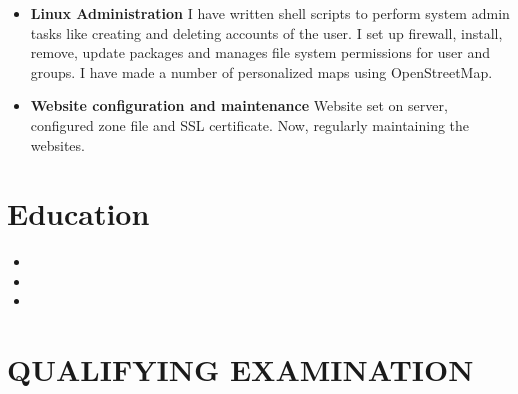 \documentclass[10.1pt,a4paper,sans]{moderncv}        %
\begin{document}
\vspace{3pt}

\begin{itemize}


\item \textbf{Linux Administration}\newline
I have written shell scripts to perform system admin tasks like creating and deleting accounts of the user.
I set up firewall, install, remove, update packages and manages file system permissions for user and groups.
I have made a number of personalized maps using OpenStreetMap.

\vspace{3pt}

\item \textbf{Website configuration and maintenance}\newline
Website set on server, configured zone file and SSL certificate. Now, regularly maintaining the websites.

\end{itemize}

\section{Education}

\vspace{3pt}

\begin{itemize}

\item{}

\item{}  %

\item{}

\end{itemize}

\section{QUALIFYING EXAMINATION}
\end{document}
